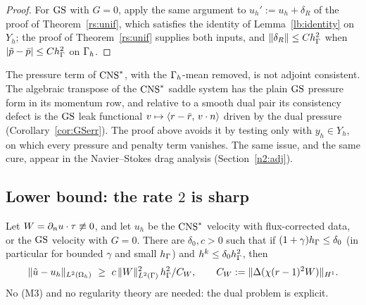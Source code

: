 \begin{proof}
For $\mathrm{GS}$ with $G=0$, apply the same argument to $u_h':=u_h+\delta_R$ of the proof of Theorem~\ref{rs:unif}, which satisfies the identity of Lemma~\ref{lb:identity} on $Y_h$; the proof of Theorem~\ref{rs:unif} supplies both inputs, and $\lVert \delta_R\rVert\le Ch_\Gamma^2$ when $|\tilde p-\bar p|\le Ch_\Gamma^2$ on $\Gamma_h$.
\end{proof}

\begin{remark}\label{l2:rem:adj}
The pressure term of $\mathrm{CNS}^\ast$, with the $\Gamma_h$-mean removed, is not adjoint consistent. The algebraic transpose of the $\mathrm{CNS}^\ast$ saddle system has the plain $\mathrm{GS}$ pressure form in its momentum row, and relative to a smooth dual pair its consistency defect is the $\mathrm{GS}$ leak functional $v\mapsto\langle r-\bar r,\, v\cdot n\rangle$ driven by the dual pressure (Corollary~\ref{cor:GSerr}). The proof above avoids it by testing only with $y_h\in Y_h$, on which every pressure and penalty term vanishes. The same issue, and the same cure, appear in the Navier--Stokes drag analysis (Section~\ref{n2:adj}).
\end{remark}

\subsection{Lower bound: the rate \texorpdfstring{$2$}{2} is sharp}

\begin{theorem}\label{l2:thm:L3}
Let $W=\partial_n u\cdot\tau\not\equiv0$, and let $u_h$ be the $\mathrm{CNS}^\ast$ velocity with flux-corrected data, or the $\mathrm{GS}$ velocity with $G=0$. There are $\delta_0,c>0$ such that if $(1+\gamma)h_\Gamma\le\delta_0$ (in particular for bounded $\gamma$ and small $h_\Gamma$) and $h^k\le\delta_0h_\Gamma^2$, then
\[
\lVert \tilde u-u_h\rVert_{L^2(\Omega_h)}\ \ge\ c\,\lVert W\rVert^2_{L^2(\Gamma)}\,h_\Gamma^2/C_W,\qquad C_W:=\lVert \Delta(\chi(r-1)^2W)\rVert_{H^1}.
\]
No (M3) and no regularity theory are needed: the dual problem is explicit.
\end{theorem}

